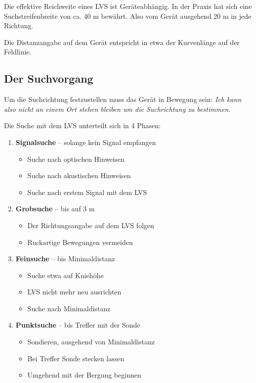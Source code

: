 Die effektive Reichweite eines LVS ist Geräteabhängig. In der Praxis hat sich eine Suchstreifenbreite von ca. 40 m bewährt. Also vom Gerät ausgehend 20 m in jede Richtung.

Die Distanzangabe auf dem Gerät entspricht in etwa der Kurvenlänge auf der Feldlinie.

\newcolumn

\subsection{Der Suchvorgang}

Um die Suchrichtung festzustellen muss das Gerät in Bewegung sein: \textit{Ich kann also nicht an einem Ort stehen bleiben um die Suchrichtung zu bestimmen.}

Die Suche mit dem LVS unterteilt sich in 4 Phasen:

\begin{enumerate}
  \item{
    \textbf{Signalsuche} -- solange kein Signal empfangen
    \begin{itemize}
      \item{Suche nach optischen Hinweisen}
      \item{Suche nach akustischen Hinweisen}
      \item{Suche nach erstem Signal mit dem LVS}
    \end{itemize}
  }
  \item{
    \textbf{Grobsuche} -- bis auf 3 m 
    \begin{itemize}
      \item{Der Richtungsangabe auf dem LVS folgen}
      \item{Ruckartige Bewegungen vermeiden}
    \end{itemize}
  }
  \item{
    \textbf{Feinsuche} -- bis Minimaldistanz
    \begin{itemize}
      \item{Suche etwa auf Kniehöhe}
      \item{LVS nicht mehr neu ausrichten}
      \item{Suche nach Minimaldistanz}
    \end{itemize}
  }
  \item{
    \textbf{Punktsuche} -- bis Treffer mit der Sonde
    \begin{itemize}
      \item{Sondieren, ausgehend von Minimaldistanz}
      \item{Bei Treffer Sonde stecken lassen}
      \item{Umgehend mit der Bergung beginnen}
    \end{itemize}
  }
\end{enumerate}

